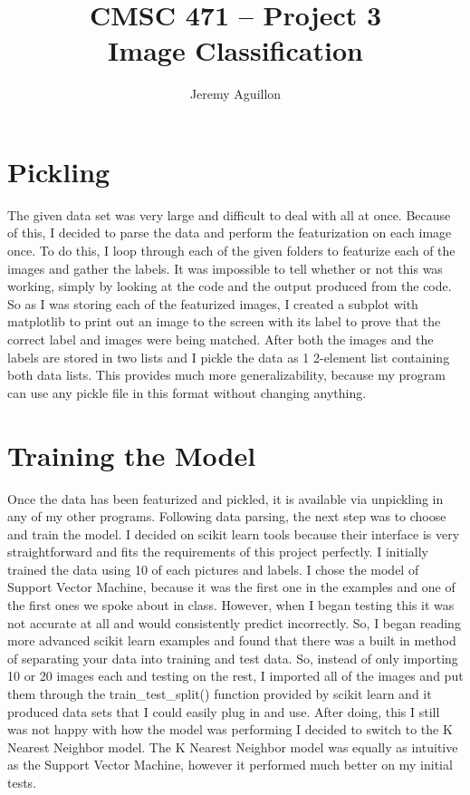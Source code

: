 \documentclass{article}
\begin{document}
\title{	CMSC 471 -- Project 3\\ 
	Image Classification}
\author{Jeremy Aguillon}

\maketitle

\newpage

\section{Pickling}

The given data set was very large and difficult to deal with all at once. Because of this, I decided to parse the data and perform the featurization on each image once. To do this, I loop through each of the given folders to featurize each of the images and gather the labels. It was impossible to tell whether or not this was working, simply by looking at the code and the output produced from the code. So as I was storing each of the featurized images, I created a subplot with matplotlib to print out an image to the screen with its label to prove that the correct label and images were being matched. After both the images and the labels are stored in two lists and I pickle the data as 1 2-element list containing both data lists. This provides much more generalizability, because my program can use any pickle file in this format without changing anything.

\section{Training the Model}

Once the data has been featurized and pickled, it is available via unpickling in any of my other programs. Following data parsing, the next step was to choose and train the model. I decided on scikit learn tools because their interface is very straightforward and fits the requirements of this project perfectly. I initially trained the data using 10 of each pictures and labels. I chose the model of Support Vector Machine, because it was the first one in the examples and one of the first ones we spoke about in class. However, when I began testing this it was not accurate at all and would consistently predict incorrectly. So, I began reading more advanced scikit learn examples and found that there was a built in method of separating your data into training and test data. So, instead of only importing 10 or 20 images each and testing on the rest, I imported all of the images and put them through the train\_test\_split() function provided by scikit learn and it produced data sets that I could easily plug in and use. After doing, this I still was not happy with how the model was performing I decided to switch to the K Nearest Neighbor model. The K Nearest Neighbor model was equally as intuitive as the Support Vector Machine, however it performed much better on my initial tests. 
\end{document}

